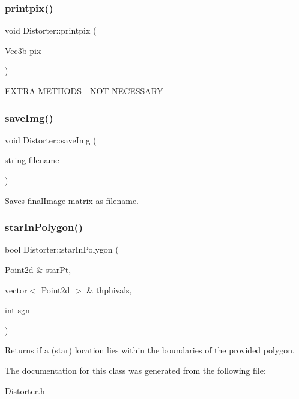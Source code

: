 \subsubsection{\texorpdfstring{printpix()}{printpix()}}
{\footnotesize\ttfamily void Distorter\+::printpix (\begin{DoxyParamCaption}\item[{Vec3b}]{pix }\end{DoxyParamCaption})\hspace{0.3cm}{\ttfamily [inline]}}

E\+X\+T\+RA M\+E\+T\+H\+O\+DS -\/ N\+OT N\+E\+C\+E\+S\+S\+A\+RY \mbox{\label{class_distorter_a548e1ccce26b010601cafcdefbac5787}} 
\subsubsection{\texorpdfstring{save\+Img()}{saveImg()}}
{\footnotesize\ttfamily void Distorter\+::save\+Img (\begin{DoxyParamCaption}\item[{string}]{filename }\end{DoxyParamCaption})\hspace{0.3cm}{\ttfamily [inline]}}

Saves final\+Image matrix as filename. \mbox{\label{class_distorter_a8b563e9c1625ffcac33e8e13469bb29b}} 
\subsubsection{\texorpdfstring{star\+In\+Polygon()}{starInPolygon()}}
{\footnotesize\ttfamily bool Distorter\+::star\+In\+Polygon (\begin{DoxyParamCaption}\item[{Point2d \&}]{star\+Pt,  }\item[{vector$<$ Point2d $>$ \&}]{thphivals,  }\item[{int}]{sgn }\end{DoxyParamCaption})\hspace{0.3cm}{\ttfamily [inline]}}

Returns if a (star) location lies within the boundaries of the provided polygon. 

The documentation for this class was generated from the following file\+:\begin{DoxyCompactItemize}
\item 
Distorter.\+h\end{DoxyCompactItemize}
